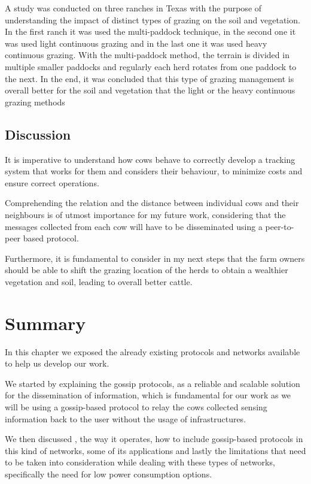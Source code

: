 A study was conducted on three ranches in Texas with the purpose of understanding the impact
of distinct types of grazing on the soil and vegetation. In the first ranch it was used the
multi-paddock technique, in the second one it was used light continuous grazing and in the
last one it was used heavy continuous grazing. With the multi-paddock method, the terrain is
divided in multiple smaller paddocks and regularly each herd rotates from one paddock to the
next. In the end, it was concluded that this type of grazing management is overall better for
the soil and vegetation that the light or the heavy continuous grazing methods \cite{Teague2011}

\subsection{Discussion}
\label{subsec:cow_discussion}
It is imperative to understand how cows behave to correctly develop a tracking system that
works for them and considers their behaviour, to minimize costs and ensure correct operations.

Comprehending the relation and the distance between individual cows and their neighbours is
of utmost importance for my future work, considering that the messages collected from each
cow will have to be disseminated using a peer-to-peer based protocol.

Furthermore, it is fundamental to consider in my next steps that the farm owners should be able
to shift the grazing location of the herds to obtain a wealthier vegetation and soil, leading
to overall better cattle.


\section{Summary}
\label{sec:summary}
In this chapter we exposed the already existing protocols and networks available to help us
develop our work.

We started by explaining the gossip protocols, as a reliable and scalable
solution for the dissemination of information, which is fundamental for our work as we will be
using a gossip-based protocol to relay the cows collected sensing information back to
the user without the usage of infrastructures.

We then discussed , the way it operates, how to include gossip-based protocols
in this kind of networks, some of its applications and lastly the limitations that need to be taken
into consideration while dealing with these types of networks, specifically the need for low power
consumption options.

